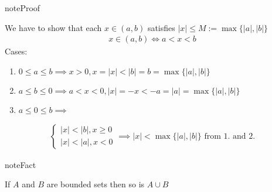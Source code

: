 \documentclass[letterpaper,10pt,english]{jupyterBook}
\begin{document}
\begin{sphinxadmonition}{note}{Proof}

\sphinxAtStartPar
We have to show that each \(x \in (a, b)\) satisfies \(|x| \leq M := \max\{ |a|, |b| \}\)
\begin{equation*}
\begin{split}
x \in (a, b) \iff a < x < b
\end{split}
\end{equation*}
\sphinxAtStartPar
Cases:
\begin{enumerate}
%
\item {} 
\sphinxAtStartPar
\(0 \le a \le b \implies x > 0, x = |x| < |b| = b = \max\{|a|,|b|\}\)

\item {} 
\sphinxAtStartPar
\(a \le b \le 0 \implies a < x < 0, |x|= -x < -a = |a| = \max\{|a|,|b|\}\)

\item {} 
\sphinxAtStartPar
\(a \le 0 \le b \implies\)

\end{enumerate}
\begin{equation*}
\begin{split}
\begin{cases}
|x|<|b|, x \ge 0\\
|x|<|a|, x < 0
\end{cases}
\implies |x|< \max\{|a|,|b|\} \text{ from 1. and 2.}
\end{split}
\end{equation*}\end{sphinxadmonition}

\begin{sphinxadmonition}{note}{Fact}

\sphinxAtStartPar
If \(A\) and \(B\) are bounded sets then so is \(A \cup B\)
\end{sphinxadmonition}
\end{document}
